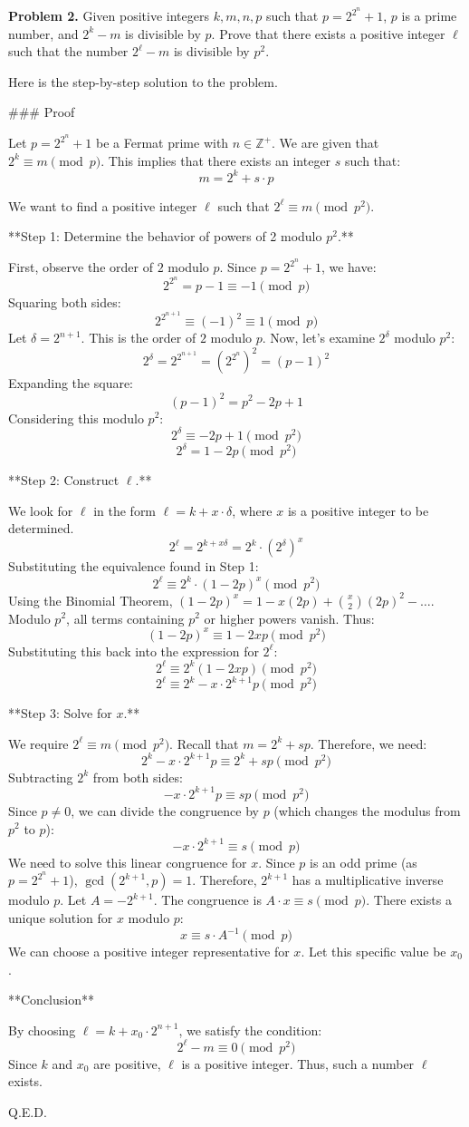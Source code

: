 \documentclass{article}
\begin{document}
\textbf{Problem 2.} Given positive integers $k, m, n, p$ such that $p = 2^{2^n} + 1$, $p$ is a prime number, and $2^k - m$ is divisible by $p$. Prove that there exists a positive integer $\ell$ such that the number $2^\ell - m$ is divisible by $p^2$.

Here is the step-by-step solution to the problem.

### Proof

Let $p = 2^{2^n} + 1$ be a Fermat prime with $n \in \mathbb{Z}^+$.
We are given that $2^k \equiv m \pmod{p}$.
This implies that there exists an integer $s$ such that:
$$ m = 2^k + s \cdot p $$

We want to find a positive integer $\ell$ such that $2^\ell \equiv m \pmod{p^2}$.

**Step 1: Determine the behavior of powers of 2 modulo $p^2$.**

First, observe the order of $2$ modulo $p$.
Since $p = 2^{2^n} + 1$, we have:
$$ 2^{2^n} = p - 1 \equiv -1 \pmod{p} $$
Squaring both sides:
$$ 2^{2^{n+1}} \equiv (-1)^2 \equiv 1 \pmod{p} $$
Let $\delta = 2^{n+1}$. This is the order of $2$ modulo $p$.
Now, let's examine $2^\delta$ modulo $p^2$:
$$ 2^\delta = 2^{2^{n+1}} = (2^{2^n})^2 = (p - 1)^2 $$
Expanding the square:
$$ (p - 1)^2 = p^2 - 2p + 1 $$
Considering this modulo $p^2$:
$$ 2^\delta \equiv -2p + 1 \pmod{p^2} $$
$$ 2^\delta = 1 - 2p \pmod{p^2} $$

**Step 2: Construct $\ell$.**

We look for $\ell$ in the form $\ell = k + x \cdot \delta$, where $x$ is a positive integer to be determined.
$$ 2^\ell = 2^{k + x\delta} = 2^k \cdot (2^\delta)^x $$
Substituting the equivalence found in Step 1:
$$ 2^\ell \equiv 2^k \cdot (1 - 2p)^x \pmod{p^2} $$
Using the Binomial Theorem, $(1 - 2p)^x = 1 - x(2p) + \binom{x}{2}(2p)^2 - \dots$.
Modulo $p^2$, all terms containing $p^2$ or higher powers vanish. Thus:
$$ (1 - 2p)^x \equiv 1 - 2xp \pmod{p^2} $$
Substituting this back into the expression for $2^\ell$:
$$ 2^\ell \equiv 2^k (1 - 2xp) \pmod{p^2} $$
$$ 2^\ell \equiv 2^k - x \cdot 2^{k+1}p \pmod{p^2} $$

**Step 3: Solve for $x$.**

We require $2^\ell \equiv m \pmod{p^2}$.
Recall that $m = 2^k + sp$. Therefore, we need:
$$ 2^k - x \cdot 2^{k+1}p \equiv 2^k + sp \pmod{p^2} $$
Subtracting $2^k$ from both sides:
$$ -x \cdot 2^{k+1}p \equiv sp \pmod{p^2} $$
Since $p \neq 0$, we can divide the congruence by $p$ (which changes the modulus from $p^2$ to $p$):
$$ -x \cdot 2^{k+1} \equiv s \pmod{p} $$
We need to solve this linear congruence for $x$.
Since $p$ is an odd prime (as $p = 2^{2^n} + 1$), $\gcd(2^{k+1}, p) = 1$.
Therefore, $2^{k+1}$ has a multiplicative inverse modulo $p$.
Let $A = -2^{k+1}$. The congruence is $A \cdot x \equiv s \pmod{p}$.
There exists a unique solution for $x$ modulo $p$:
$$ x \equiv s \cdot A^{-1} \pmod{p} $$
We can choose a positive integer representative for $x$. Let this specific value be $x_0$.

**Conclusion**

By choosing $\ell = k + x_0 \cdot 2^{n+1}$, we satisfy the condition:
$$ 2^\ell - m \equiv 0 \pmod{p^2} $$
Since $k$ and $x_0$ are positive, $\ell$ is a positive integer.
Thus, such a number $\ell$ exists.

Q.E.D.
\end{document}
